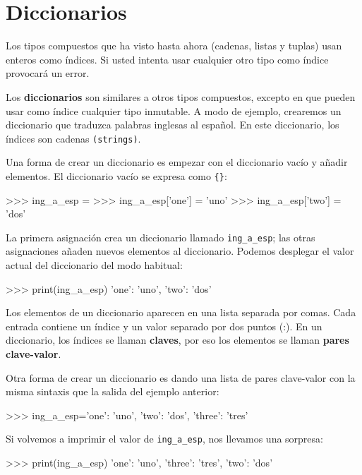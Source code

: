 
\chapter{Diccionarios}

  
  

Los tipos compuestos que ha visto hasta ahora (cadenas, listas y tuplas)
usan enteros como índices. Si usted intenta usar cualquier otro tipo
como índice provocará un error.

Los \textbf{diccionarios} son similares a otros tipos compuestos,
excepto en que pueden usar como índice cualquier tipo inmutable. A
modo de ejemplo, crearemos un diccionario que traduzca palabras inglesas
al español. En este diccionario, los índices son cadenas \texttt{(strings)}.

Una forma de crear un diccionario es empezar con el diccionario vacío
y añadir elementos. El diccionario vacío se expresa como \texttt{\{\}}:
\begin{pyconcode}
>>> ing_a_esp = {}
>>> ing_a_esp['one'] = 'uno'
>>> ing_a_esp['two'] = 'dos'
\end{pyconcode}

La primera asignación crea un diccionario llamado \texttt{ing\_a\_esp};
las otras asignaciones añaden nuevos elementos al diccionario. Podemos
desplegar el valor actual del diccionario del modo habitual:
\begin{pyconcode}
>>> print(ing_a_esp)
{'one': 'uno', 'two': 'dos'}
\end{pyconcode}

Los elementos de un diccionario aparecen en una lista separada por
comas. Cada entrada contiene un índice y un valor separado por dos
puntos (:). En un diccionario, los índices se llaman \textbf{claves},
por eso los elementos se llaman \textbf{pares clave-valor}.

Otra forma de crear un diccionario es dando una lista de pares clave-valor
con la misma sintaxis que la salida del ejemplo anterior:
\begin{pyconcode}
>>> ing_a_esp={'one': 'uno', 'two': 'dos', 'three': 'tres'}
\end{pyconcode}

Si volvemos a imprimir el valor de \texttt{ing\_a\_esp}, nos llevamos
una sorpresa:
\begin{pyconcode}
>>> print(ing_a_esp)
{'one': 'uno', 'three': 'tres', 'two': 'dos'}
\end{pyconcode}

